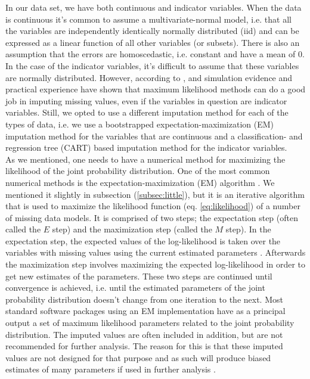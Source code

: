 \documentclass[../thesis.tex]{subfiles}
\begin{document}
\indent In our data set, we have both continuous and indicator variables. When the data is continuous it's common to assume a multivariate-normal model, i.e. that all the variables are independently identically normally distributed (iid) and can be expressed as a linear function of all other variables (or subsets). There is also an assumption that the errors are homoscedastic, i.e. constant and have a mean of 0. In the case of the indicator variables, it's difficult to assume that these variables are normally distributed. However, according to \cite{schafer1997analysis}, \cite{schafer1998multiple} and \cite{allison1999missing} simulation evidence and practical experience have shown that maximum likelihood methods can do a good job in imputing missing values, even if the variables in question are indicator variables. Still, we opted to use a different imputation method for each of the types of data, i.e. we use a bootstrapped expectation-maximization (EM) imputation method for the variables that are continuous and a classification- and regression tree (CART) based imputation method for the indicator variables.\\
\indent As we mentioned, one needs to have a numerical method for maximizing the likelihood of the joint probability distribution. One of the most common numerical methods is the expectation-maximization (EM) algorithm \citep{dempster1977maximum}. We mentioned it slightly in subsection (\ref{subsec:little}), but it is an iterative algorithm that is used to maximize the likelihood function (eq. \ref{eq:likelihood}) of a number of missing data models. It is comprised of two steps; the expectation step (often called the $E$ step) and the maximization step (called the $M$ step). In the expectation step, the expected values of the log-likelihood is taken over the variables with missing values using the current estimated parameters \citep{allison1999missing}. Afterwards the maximization step involves maximizing the expected log-likelihood in order to get new estimates of the parameters. These two steps are continued until convergence is achieved, i.e. until the estimated parameters of the joint probability distribution doesn't change from one iteration to the next. Most standard software packages using an EM implementation have as a principal output a set of maximum likelihood parameters related to the joint probability distribution. The imputed values are often included in addition, but are not recommended for further analysis. The reason for this is that these imputed values are not designed for that purpose and as such will produce biased estimates of many parameters if used in further analysis \citep{allison1999missing}.\\
\end{document}
